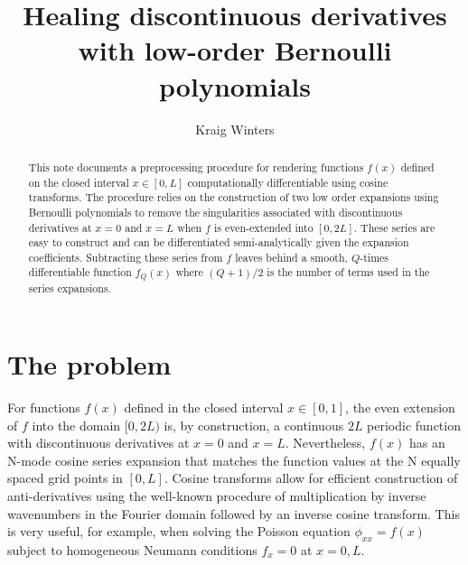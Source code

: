 \documentclass{jfm-like}
\title{Healing discontinuous derivatives with low-order Bernoulli polynomials}
\author{Kraig Winters
  }
\affiliation{Scripps Institution of Oceanography, University of California San Diego,
La Jolla, CA 92093, USA
}
\begin{document}
\maketitle

\begin{abstract}
This note documents  a preprocessing procedure for rendering functions $f(x)$ defined on the closed interval $x \in [0,L]$ computationally differentiable using cosine transforms.
The procedure relies on the construction of two low order expansions using Bernoulli polynomials to remove the singularities associated with discontinuous derivatives at $x=0$
and $x=L$ when $f$ is even-extended into $[0,2L]$. These series are easy to construct and can be differentiated semi-analytically given the expansion coefficients. Subtracting
these series from $f$ leaves behind a smooth, $Q$-times differentiable function $f_Q(x)$ where $(Q+1)/2$ is the number of terms used in the series expansions.
\end{abstract}


\section{The problem}
For functions $f(x)$ defined in the closed interval $x \in [0,1]$, the even extension of $f$ into the domain $[0,2L)$ is, by construction, a continuous $2L$ periodic  function with
discontinuous derivatives at $x=0$ and $x=L$. Nevertheless, $f(x)$ has an N-mode cosine series expansion that matches the function values at the N equally spaced grid points in $[0,L]$. Cosine transforms
allow for efficient construction of anti-derivatives using the well-known procedure of multiplication by inverse wavenumbers in the Fourier domain followed by an inverse cosine transform.
This is very useful, for example, when solving the Poisson equation $ \phi_{xx} = f(x)$ subject to homogeneous Neumann conditions $f_x=0$ at $x=0,L$.
\end{document}
